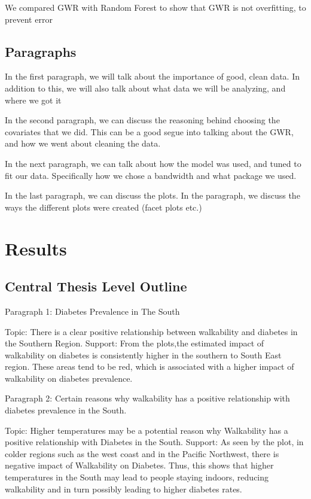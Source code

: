\documentclass[
]{article}
\begin{document}
We compared GWR with Random Forest to show that GWR is not overfitting,
to prevent error

\subsection{Paragraphs}\label{paragraphs}

In the first paragraph, we will talk about the importance of good, clean
data. In addition to this, we will also talk about what data we will be
analyzing, and where we got it

In the second paragraph, we can discuss the reasoning behind choosing
the covariates that we did. This can be a good segue into talking about
the GWR, and how we went about cleaning the data.

In the next paragraph, we can talk about how the model was used, and
tuned to fit our data. Specifically how we chose a bandwidth and what
package we used.

In the last paragraph, we can discuss the plots. In the paragraph, we
discuss the ways the different plots were created (facet plots etc.)

\section{Results}\label{results}

\subsection{Central Thesis Level
Outline}\label{central-thesis-level-outline}

Paragraph 1: Diabetes Prevalence in The South

Topic: There is a clear positive relationship between walkability and
diabetes in the Southern Region. Support: From the plots,the estimated
impact of walkability on diabetes is consistently higher in the southern
to South East region. These areas tend to be red, which is associated
with a higher impact of walkability on diabetes prevalence.

Paragraph 2: Certain reasons why walkability has a positive relationship
with diabetes prevalence in the South.

Topic: Higher temperatures may be a potential reason why Walkability has
a positive relationship with Diabetes in the South. Support: As seen by
the plot, in colder regions such as the west coast and in the Pacific
Northwest, there is negative impact of Walkability on Diabetes. Thus,
this shows that higher temperatures in the South may lead to people
staying indoors, reducing walkability and in turn possibly leading to
higher diabetes rates.
\end{document}
